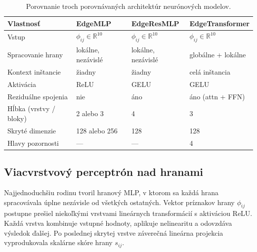 \begin{table}[H]
\centering
\caption{Porovnanie troch porovnávaných architektúr neurónových modelov.}
\label{tab:arch_porovnanie}
\begin{tabular}{lp{2.6cm}p{2.6cm}p{3.2cm}}
\hline
\textbf{Vlastnosť}       & \textbf{EdgeMLP}               & \textbf{EdgeResMLP}            & \textbf{EdgeTransformer}         \\ \hline
Vstup                    & \(\phi_{ij}\in\mathbb{R}^{10}\) & \(\phi_{ij}\in\mathbb{R}^{10}\) & \(\phi_{ij}\in\mathbb{R}^{10}\)  \\
Spracovanie hrany        & lokálne, nezávislé             & lokálne, nezávislé             & globálne + lokálne               \\
Kontext inštancie        & žiadny                         & žiadny                         & celá inštancia                   \\
Aktivácia                & ReLU                           & GELU                           & GELU                             \\
Reziduálne spojenia      & nie                            & áno                            & áno (attn + FFN)                 \\
Hĺbka (vrstvy / bloky)  & 2 alebo 3                      & 4                              & 3                                \\
Skryté dimenzie          & 128 alebo 256                  & 128                            & 128                              \\
Hlavy pozornosti         & —                              & —                              & 4                                \\ \hline
\end{tabular}
\end{table}

\subsection{Viacvrstvový perceptrón nad hranami}
\label{sec:edge_mlp}

\indent Najjednoduchšiu rodinu tvoril hranový MLP, v ktorom sa každá
hrana spracovávala úplne nezávisle od všetkých ostatných. Vektor
príznakov hrany \(\phi_{ij}\) postupne prešiel niekoľkými vrstvami
lineárnych transformácií s aktiváciou ReLU. Každá vrstva kombinuje
vstupné hodnoty, aplikuje nelinearitu a odovzdáva výsledok ďalšej.
Po poslednej skrytej vrstve záverečná lineárna projekcia vyprodukovala
skalárne skóre hrany \(s_{ij}\).

